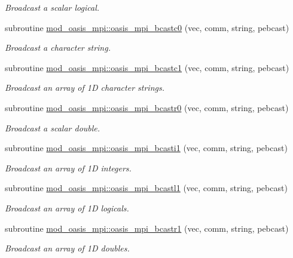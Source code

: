 \begin{DoxyCompactItemize}
\begin{DoxyCompactList}\small\item\em Broadcast a scalar logical. \end{DoxyCompactList}\item 
subroutine \hyperlink{namespacemod__oasis__mpi_a6d10e1673748a91dc7ec955ef16d771a}{mod\+\_\+oasis\+\_\+mpi\+::oasis\+\_\+mpi\+\_\+bcastc0} (vec, comm, string, pebcast)
\begin{DoxyCompactList}\small\item\em Broadcast a character string. \end{DoxyCompactList}\item 
subroutine \hyperlink{namespacemod__oasis__mpi_a99b3a1ab4c7617b5bc83d3c6360aaef3}{mod\+\_\+oasis\+\_\+mpi\+::oasis\+\_\+mpi\+\_\+bcastc1} (vec, comm, string, pebcast)
\begin{DoxyCompactList}\small\item\em Broadcast an array of 1D character strings. \end{DoxyCompactList}\item 
subroutine \hyperlink{namespacemod__oasis__mpi_a3b21bebef1b56b31bd6d07e83d7a59a6}{mod\+\_\+oasis\+\_\+mpi\+::oasis\+\_\+mpi\+\_\+bcastr0} (vec, comm, string, pebcast)
\begin{DoxyCompactList}\small\item\em Broadcast a scalar double. \end{DoxyCompactList}\item 
subroutine \hyperlink{namespacemod__oasis__mpi_a6f9140637f29d3939dc9c53930101e2e}{mod\+\_\+oasis\+\_\+mpi\+::oasis\+\_\+mpi\+\_\+bcasti1} (vec, comm, string, pebcast)
\begin{DoxyCompactList}\small\item\em Broadcast an array of 1D integers. \end{DoxyCompactList}\item 
subroutine \hyperlink{namespacemod__oasis__mpi_a8b03787549fba5faff499c946d521db0}{mod\+\_\+oasis\+\_\+mpi\+::oasis\+\_\+mpi\+\_\+bcastl1} (vec, comm, string, pebcast)
\begin{DoxyCompactList}\small\item\em Broadcast an array of 1D logicals. \end{DoxyCompactList}\item 
subroutine \hyperlink{namespacemod__oasis__mpi_a6f12178b027ff30cb87f9f8313b459d5}{mod\+\_\+oasis\+\_\+mpi\+::oasis\+\_\+mpi\+\_\+bcastr1} (vec, comm, string, pebcast)
\begin{DoxyCompactList}\small\item\em Broadcast an array of 1D doubles. \end{DoxyCompactList}\item 

\end{DoxyCompactItemize}
